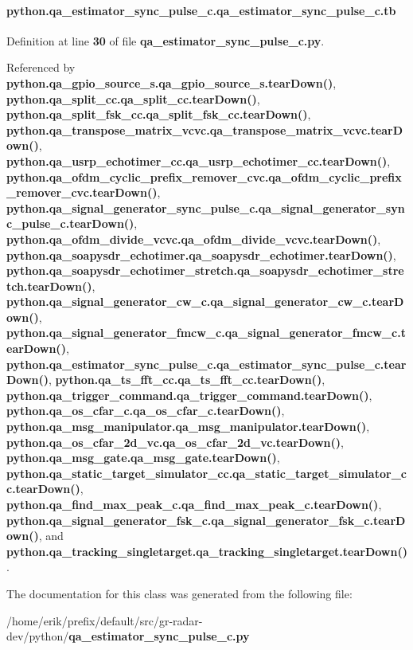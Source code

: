\paragraph[{tb}]{\setlength{\rightskip}{0pt plus 5cm}python.\+qa\+\_\+estimator\+\_\+sync\+\_\+pulse\+\_\+c.\+qa\+\_\+estimator\+\_\+sync\+\_\+pulse\+\_\+c.\+tb}\label{classpython_1_1qa__estimator__sync__pulse__c_1_1qa__estimator__sync__pulse__c_a0481a11216e45fdce6d1aa43ec81181f}


Definition at line {\bf 30} of file {\bf qa\+\_\+estimator\+\_\+sync\+\_\+pulse\+\_\+c.\+py}.



Referenced by {\bf python.\+qa\+\_\+gpio\+\_\+source\+\_\+s.\+qa\+\_\+gpio\+\_\+source\+\_\+s.\+tear\+Down()}, {\bf python.\+qa\+\_\+split\+\_\+cc.\+qa\+\_\+split\+\_\+cc.\+tear\+Down()}, {\bf python.\+qa\+\_\+split\+\_\+fsk\+\_\+cc.\+qa\+\_\+split\+\_\+fsk\+\_\+cc.\+tear\+Down()}, {\bf python.\+qa\+\_\+transpose\+\_\+matrix\+\_\+vcvc.\+qa\+\_\+transpose\+\_\+matrix\+\_\+vcvc.\+tear\+Down()}, {\bf python.\+qa\+\_\+usrp\+\_\+echotimer\+\_\+cc.\+qa\+\_\+usrp\+\_\+echotimer\+\_\+cc.\+tear\+Down()}, {\bf python.\+qa\+\_\+ofdm\+\_\+cyclic\+\_\+prefix\+\_\+remover\+\_\+cvc.\+qa\+\_\+ofdm\+\_\+cyclic\+\_\+prefix\+\_\+remover\+\_\+cvc.\+tear\+Down()}, {\bf python.\+qa\+\_\+signal\+\_\+generator\+\_\+sync\+\_\+pulse\+\_\+c.\+qa\+\_\+signal\+\_\+generator\+\_\+sync\+\_\+pulse\+\_\+c.\+tear\+Down()}, {\bf python.\+qa\+\_\+ofdm\+\_\+divide\+\_\+vcvc.\+qa\+\_\+ofdm\+\_\+divide\+\_\+vcvc.\+tear\+Down()}, {\bf python.\+qa\+\_\+soapysdr\+\_\+echotimer.\+qa\+\_\+soapysdr\+\_\+echotimer.\+tear\+Down()}, {\bf python.\+qa\+\_\+soapysdr\+\_\+echotimer\+\_\+stretch.\+qa\+\_\+soapysdr\+\_\+echotimer\+\_\+stretch.\+tear\+Down()}, {\bf python.\+qa\+\_\+signal\+\_\+generator\+\_\+cw\+\_\+c.\+qa\+\_\+signal\+\_\+generator\+\_\+cw\+\_\+c.\+tear\+Down()}, {\bf python.\+qa\+\_\+signal\+\_\+generator\+\_\+fmcw\+\_\+c.\+qa\+\_\+signal\+\_\+generator\+\_\+fmcw\+\_\+c.\+tear\+Down()}, {\bf python.\+qa\+\_\+estimator\+\_\+sync\+\_\+pulse\+\_\+c.\+qa\+\_\+estimator\+\_\+sync\+\_\+pulse\+\_\+c.\+tear\+Down()}, {\bf python.\+qa\+\_\+ts\+\_\+fft\+\_\+cc.\+qa\+\_\+ts\+\_\+fft\+\_\+cc.\+tear\+Down()}, {\bf python.\+qa\+\_\+trigger\+\_\+command.\+qa\+\_\+trigger\+\_\+command.\+tear\+Down()}, {\bf python.\+qa\+\_\+os\+\_\+cfar\+\_\+c.\+qa\+\_\+os\+\_\+cfar\+\_\+c.\+tear\+Down()}, {\bf python.\+qa\+\_\+msg\+\_\+manipulator.\+qa\+\_\+msg\+\_\+manipulator.\+tear\+Down()}, {\bf python.\+qa\+\_\+os\+\_\+cfar\+\_\+2d\+\_\+vc.\+qa\+\_\+os\+\_\+cfar\+\_\+2d\+\_\+vc.\+tear\+Down()}, {\bf python.\+qa\+\_\+msg\+\_\+gate.\+qa\+\_\+msg\+\_\+gate.\+tear\+Down()}, {\bf python.\+qa\+\_\+static\+\_\+target\+\_\+simulator\+\_\+cc.\+qa\+\_\+static\+\_\+target\+\_\+simulator\+\_\+cc.\+tear\+Down()}, {\bf python.\+qa\+\_\+find\+\_\+max\+\_\+peak\+\_\+c.\+qa\+\_\+find\+\_\+max\+\_\+peak\+\_\+c.\+tear\+Down()}, {\bf python.\+qa\+\_\+signal\+\_\+generator\+\_\+fsk\+\_\+c.\+qa\+\_\+signal\+\_\+generator\+\_\+fsk\+\_\+c.\+tear\+Down()}, and {\bf python.\+qa\+\_\+tracking\+\_\+singletarget.\+qa\+\_\+tracking\+\_\+singletarget.\+tear\+Down()}.



The documentation for this class was generated from the following file\+:\begin{DoxyCompactItemize}
\item 
/home/erik/prefix/default/src/gr-\/radar-\/dev/python/{\bf qa\+\_\+estimator\+\_\+sync\+\_\+pulse\+\_\+c.\+py}\end{DoxyCompactItemize}
